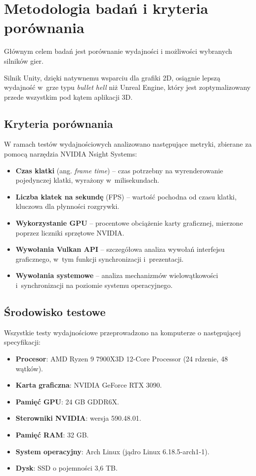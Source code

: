 \clearpage
\section{Metodologia badań i kryteria porównania}

Głównym celem badań jest porównanie wydajności i możliwości 
wybranych silników gier.

Silnik Unity, dzięki natywnemu wsparciu dla grafiki 2D, osiągnie lepszą
wydajność w~grze typu \emph{bullet hell} niż Unreal Engine, który jest
zoptymalizowany przede wszystkim pod kątem aplikacji 3D.

\subsection{Kryteria porównania}

W ramach testów wydajnościowych analizowano następujące metryki, zbierane
za pomocą narzędzia NVIDIA Nsight Systems:

\begin{itemize}
    \item \textbf{Czas klatki} (ang. \emph{frame time}) -- czas potrzebny
    na wyrenderowanie pojedynczej klatki, wyrażony w~milisekundach.
    \item \textbf{Liczba klatek na sekundę} (FPS) -- wartość pochodna
    od czasu klatki, kluczowa dla płynności rozgrywki.
    \item \textbf{Wykorzystanie GPU} -- procentowe obciążenie karty graficznej,
    mierzone poprzez liczniki sprzętowe NVIDIA.
    \item \textbf{Wywołania Vulkan API} -- szczegółowa analiza wywołań
    interfejsu graficznego, w~tym funkcji synchronizacji i~prezentacji.
    \item \textbf{Wywołania systemowe} -- analiza mechanizmów wielowątkowości
    i~synchronizacji na poziomie systemu operacyjnego.
\end{itemize}

\subsection{Środowisko testowe}

\label{subsubsec:specyfikacja-sprzetowa}

Wszystkie testy wydajnościowe przeprowadzono na komputerze o następującej specyfikacji:

\begin{itemize}
    \item \textbf{Procesor}: AMD Ryzen 9 7900X3D 12-Core Processor (24 rdzenie, 48 wątków).
    \item \textbf{Karta graficzna}: NVIDIA GeForce RTX 3090.
    \item \textbf{Pamięć GPU}: 24 GB GDDR6X.
    \item \textbf{Sterowniki NVIDIA}: wersja 590.48.01.
    \item \textbf{Pamięć RAM}: 32 GB.
    \item \textbf{System operacyjny}: Arch Linux (jądro Linux 6.18.5-arch1-1).
    \item \textbf{Dysk}: SSD o pojemności 3,6 TB.
\end{itemize}

